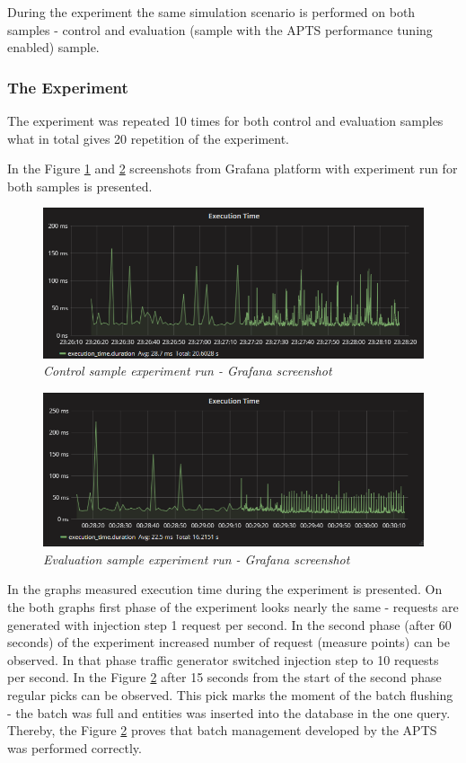 \documentclass[12pt,a4paper]{article}
\begin{document}
During the experiment the same simulation scenario is performed on both samples - control and evaluation (sample with the APTS performance tuning enabled) sample.

\subsubsection{The Experiment} 

The experiment was repeated 10 times for both control and evaluation samples what in total gives 20 repetition of the experiment. 

In the Figure \ref{batchevaluationscreencontrol} and \ref{batchevaluationscreenevaluation} screenshots from Grafana platform with experiment run for both samples is presented. 

\begin{figure}[!htb]
\centering
\includegraphics[width=1\textwidth]{batchCtrl}
\caption{\textit{Control sample experiment run - Grafana screenshot}} \label{batchevaluationscreencontrol}
\end{figure}
\begin{figure}[!htb]
\centering
\includegraphics[width=1\textwidth]{batchEval}
\caption{\textit{Evaluation sample experiment run - Grafana screenshot}} \label{batchevaluationscreenevaluation}
\end{figure}

In the graphs measured execution time during the experiment is presented. On the both graphs first phase of the experiment looks nearly the same - requests are generated with injection step 1 request per second. In the second phase (after 60 seconds) of the experiment increased number of request (measure points) can be observed. In that phase traffic generator switched injection step to 10 requests per second. In the Figure \ref{batchevaluationscreenevaluation} after 15 seconds from the start of the second phase regular picks can be observed. This pick marks the moment of the batch flushing - the batch was full and entities was inserted into the database in the one query. Thereby, the Figure \ref{batchevaluationscreenevaluation} proves that batch management developed by the APTS was performed correctly. 
\end{document}

